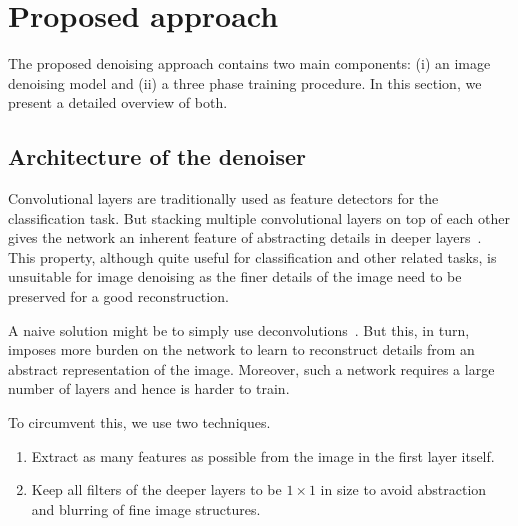 \documentclass[10pt,twocolumn,letterpaper]{proc}
\begin{document}



\section{Proposed approach}\label{sec:proposed}
    
The proposed denoising approach contains two main components: (i) an image denoising model  and (ii) a three phase training procedure. In this section, we present a detailed overview of both.


\subsection{Architecture of the denoiser}
\label{sec:arch}






Convolutional layers are traditionally used as feature detectors for the classification task. But stacking multiple convolutional layers on top of each other gives the network an inherent feature of abstracting details in deeper layers~\cite{gatys2015neural}. This property, although quite useful for classification and other related tasks, is unsuitable for image denoising as the finer details of the image need to be preserved for a good reconstruction.


A naive solution might be to simply use deconvolutions~\cite{deconv-eccv-2014}. But this, in turn, imposes more burden on the network to learn to reconstruct details from an abstract representation of the image. Moreover, such a network requires a large number of layers and hence is harder to train.

To circumvent this, we use two techniques.
\begin{enumerate}
    \item Extract as many features as possible from the image in the first layer itself.
    \item Keep all filters of the deeper layers to be $1 \times 1$ in size to avoid abstraction and blurring of fine image structures.
\end{enumerate}
\end{document}
